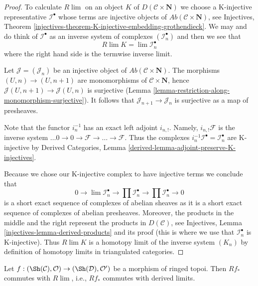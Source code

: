\begin{proof}
To calculate $R\lim$ on an object $K$ of $D(\mathcal{C} \times \mathbf{N})$
we choose a K-injective representative $\mathcal{I}^\bullet$ whose terms are
injective objects of $\textit{Ab}(\mathcal{C} \times \mathbf{N})$, see
Injectives, Theorem
\ref{injectives-theorem-K-injective-embedding-grothendieck}.
We may and do think of $\mathcal{I}^\bullet$ as an inverse system of
complexes $(\mathcal{I}_n^\bullet)$ and then we see that
$$
R\lim K = \lim \mathcal{I}_n^\bullet
$$
where the right hand side is the termwise inverse limit.

\medskip\noindent
Let $\mathcal{J} = (\mathcal{J}_n)$ be an injective object of
$\textit{Ab}(\mathcal{C} \times \mathbf{N})$. The morphisms
$(U, n) \to (U, n + 1)$ are monomorphisms of
$\mathcal{C} \times \mathbf{N}$, hence
$\mathcal{J}(U, n + 1) \to \mathcal{J}(U, n)$ is surjective
(Lemma \ref{lemma-restriction-along-monomorphism-surjective}).
It follows that $\mathcal{J}_{n + 1} \to \mathcal{J}_n$ is
surjective as a map of presheaves.

\medskip\noindent
Note that the functor $i_n^{-1}$ has an exact left adjoint $i_{n, !}$.
Namely, $i_{n, !}\mathcal{F}$ is the inverse system
$\ldots 0 \to 0 \to \mathcal{F} \to \ldots \to \mathcal{F}$.
Thus the complexes $i_n^{-1}\mathcal{I}^\bullet = \mathcal{I}_n^\bullet$
are K-injective by
Derived Categories, Lemma \ref{derived-lemma-adjoint-preserve-K-injectives}.

\medskip\noindent
Because we chose our K-injective complex to have injective terms
we conclude that
$$
0 \to  \lim \mathcal{I}_n^\bullet \to \prod \mathcal{I}_n^\bullet
\to \prod \mathcal{I}_n^\bullet \to 0
$$
is a short exact sequence of complexes of abelian sheaves as it
is a short exact sequence of complexes of abelian presheaves.
Moreover, the products in the middle and the right represent
the products in $D(\mathcal{C})$, see
Injectives, Lemma \ref{injectives-lemma-derived-products} and its
proof (this is where we use that $\mathcal{I}_n^\bullet$ is K-injective).
Thus $R\lim K$ is a homotopy limit of the inverse system $(K_n)$
by definition of homotopy limits in triangulated categories.
\end{proof}

\begin{lemma}
\label{lemma-Rf-commutes-with-Rlim}
Let $f : (\Sh(\mathcal{C}), \mathcal{O}) \to (\Sh(\mathcal{D}), \mathcal{O}')$
be a morphism of ringed topoi. Then $Rf_*$ commutes with $R\lim$, i.e.,
$Rf_*$ commutes with derived limits.
\end{lemma}

